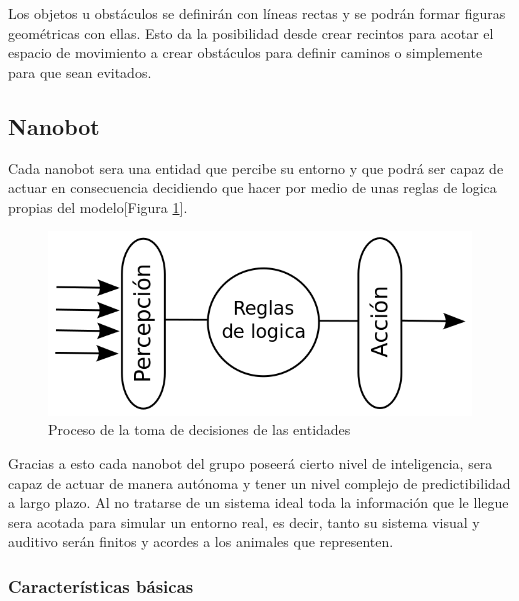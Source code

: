 Los objetos u obstáculos se definirán con líneas rectas y se podrán formar figuras geométricas con ellas.  Esto da la posibilidad desde crear recintos para acotar el espacio de movimiento a crear obstáculos para definir caminos o simplemente para que sean evitados.
 
\subsection{Nanobot}
\label{sec:nanobot}

Cada nanobot sera una entidad que percibe su entorno y que podrá ser capaz de actuar en consecuencia decidiendo que hacer por medio de unas reglas de logica propias del modelo[Figura \ref{fig:../images/procesoNanobot.png}].
\begin{figure}[h]
 \centering
 \includegraphics[scale=0.3]{../images/procesoNanobot.png}
 \caption{Proceso de la toma de decisiones de las entidades}
 \label{fig:../images/procesoNanobot.png}
\end{figure}

Gracias a esto cada nanobot del grupo poseerá cierto nivel de inteligencia, sera capaz de actuar de manera autónoma y  tener un nivel complejo de predictibilidad  a largo plazo. Al no tratarse de un sistema ideal toda la información que le llegue sera acotada para simular un entorno real, es decir, tanto su sistema visual y auditivo serán finitos y acordes a los animales que representen.

\subsubsection{Características básicas}
\label{sec:caracteristicas_basicas}


